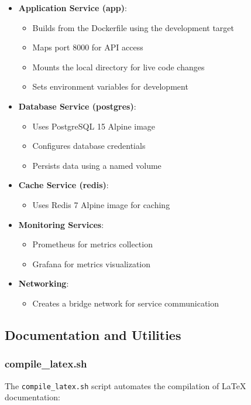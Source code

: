 \begin{itemize}
    \item \textbf{Application Service (app)}:
    \begin{itemize}
        \item Builds from the Dockerfile using the development target
        \item Maps port 8000 for API access
        \item Mounts the local directory for live code changes
        \item Sets environment variables for development
    \end{itemize}
    
    \item \textbf{Database Service (postgres)}:
    \begin{itemize}
        \item Uses PostgreSQL 15 Alpine image
        \item Configures database credentials
        \item Persists data using a named volume
    \end{itemize}
    
    \item \textbf{Cache Service (redis)}:
    \begin{itemize}
        \item Uses Redis 7 Alpine image for caching
    \end{itemize}
    
    \item \textbf{Monitoring Services}:
    \begin{itemize}
        \item Prometheus for metrics collection
        \item Grafana for metrics visualization
    \end{itemize}
    
    \item \textbf{Networking}:
    \begin{itemize}
        \item Creates a bridge network for service communication
    \end{itemize}
\end{itemize}

\subsection{Documentation and Utilities}

\subsubsection{compile\_latex.sh}
The \texttt{compile\_latex.sh} script automates the compilation of LaTeX documentation:

